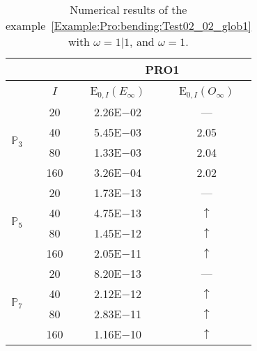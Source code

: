 \begin{table}[H]
\caption{Numerical results of the example~\ref{Example:Pro:bending:Test02_02_glob1} with $\omega=1|1$, and $\omega=1$.}
\setlength{\tabcolsep}{5pt}
\centering
\begin{tabular}{@{}l c c c@{}}
\toprule
 &  & \multicolumn{2}{c}{PRO1}\\
\midrule
 & $I$ & E$_{0,I}(E_{\infty})$ & E$_{0,I}(O_{\infty})$\\
\midrule
\multirow{4}{*}{$\mathbb{P}_{3}$} & 20 & 2.26E$-$02 & ---\\
 & 40 & 5.45E$-$03 & 2.05\\
 & 80 & 1.33E$-$03 & 2.04\\
 & 160 & 3.26E$-$04 & 2.02\\
\midrule
\multirow{4}{*}{$\mathbb{P}_{5}$} & 20 & 1.73E$-$13 & ---\\
 & 40 & 4.75E$-$13 & $\uparrow$\\
 & 80 & 1.45E$-$12 & $\uparrow$\\
 & 160 & 2.05E$-$11 & $\uparrow$\\
\midrule
\multirow{4}{*}{$\mathbb{P}_{7}$} & 20 & 8.20E$-$13 & ---\\
 & 40 & 2.12E$-$12 & $\uparrow$\\
 & 80 & 2.83E$-$11 & $\uparrow$\\
 & 160 & 1.16E$-$10 & $\uparrow$\\
\bottomrule
\end{tabular}
\label{Table:PRO:test_02_02_test9}
\end{table}
